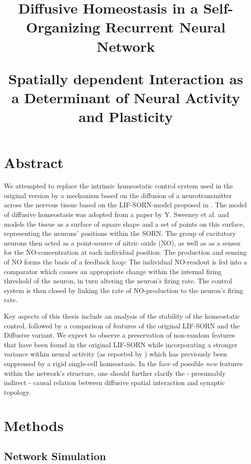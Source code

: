 \documentclass[10pt,a4paper]{article}
\title{Diffusive Homeostasis in a Self-Organizing Recurrent Neural Network \\
\begin{large}
Spatially dependent Interaction as a Determinant of Neural Activity and Plasticity
\end{large}
}
\begin{document}
\maketitle
\section{Abstract} \label{abstract}
We attempted to replace the intrinsic homeostatic control system used in the original version by a mechanism based on the diffusion of a neurotransmitter across the nervous tissue based on the LIF-SORN-model proposed in \cite{SORN_Paper}. The model of diffusive homeostasis was adopted from a paper by Y. Sweeney et al. \cite{Sweeney_Paper} and models the tissue as a surface of square shape and a set of points on this surface, representing the neurons' positions within the SORN. The group of excitatory neurons then acted as a point-source of nitric oxide (NO), as well as as a sensor for the NO-concentration at each individual position. The production and sensing of NO forms the basis of a feedback loop: The individual NO-readout is fed into a comparator which causes an appropriate change within the internal firing threshold of the neuron, in turn altering the neuron's firing rate. The control system is then closed by linking the rate of NO-production to the neuron's firing rate.

Key aspects of this thesis include an analysis of the stability of the homeostatic control, followed by a comparison of features of the original LIF-SORN and the Diffusive variant. We expect to observe a preservation of non-random features that have been found in the original LIF-SORN while incorporating a stronger variance within neural activity (as reported by \cite{Sweeney_Paper}) which has previously been suppressed by a rigid single-cell homeostasis. In the face of possible \emph{new} features within the network's structure, one should further clarify the - presumably indirect - causal relation between diffusive spatial interaction and synaptic topology. 





\section{Methods} \label{methods}
\subsection{Network Simulation} \label{network simulation}
\end{document}
